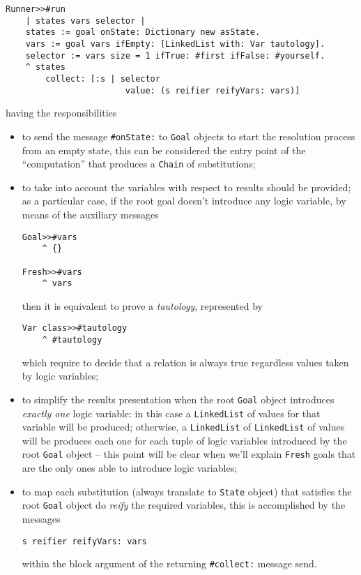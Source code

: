 \documentclass[a4paper,11pt]{article}
\begin{document}
\begin{verbatim}
Runner>>#run
    | states vars selector |
    states := goal onState: Dictionary new asState.
    vars := goal vars ifEmpty: [LinkedList with: Var tautology].
    selector := vars size = 1 ifTrue: #first ifFalse: #yourself.
    ^ states
        collect: [:s | selector
                        value: (s reifier reifyVars: vars)]
\end{verbatim}
having the responsibilities
\begin{itemize}

\item to send the message \Verb|#onState:| to \Verb|Goal| objects to start the
resolution process from an empty state, this can be considered the entry point of
the ``computation'' that produces a \Verb|Chain| of substitutions;

\item to take into account the variables with respect to results should be
provided; as a particular case, if the root goal doesn't introduce any logic
variable, by means of the auxiliary messages
\begin{verbatim}
Goal>>#vars
    ^ {}

Fresh>>#vars
    ^ vars
\end{verbatim}
then it is equivalent to prove a \textit{tautology}, represented by
\begin{verbatim}
Var class>>#tautology
    ^ #tautology
\end{verbatim}
which require to decide that a relation is always true regardless values taken
by logic variables;

\item to simplify the results presentation when the root \Verb|Goal| object
introduces \textit{exactly one} logic variable: in this case a
\Verb|LinkedList| of values for that variable will be produced; otherwise, a
\Verb|LinkedList| of \Verb|LinkedList| of values will be produces each one for
each tuple of logic variables introduced by the root \Verb|Goal| object -- this
point will be clear when we'll explain \Verb|Fresh| goals that are the only
ones able to introduce logic variables;

\item to map each substitution (always translate to \Verb|State| object) that
satisfies the root \Verb|Goal| object do \textit{reify} the required variables,
this is accomplished by the messages
\begin{verbatim}
s reifier reifyVars: vars
\end{verbatim}
within the block argument of the returning \Verb|#collect:| message send.
\end{itemize}
\end{document}
